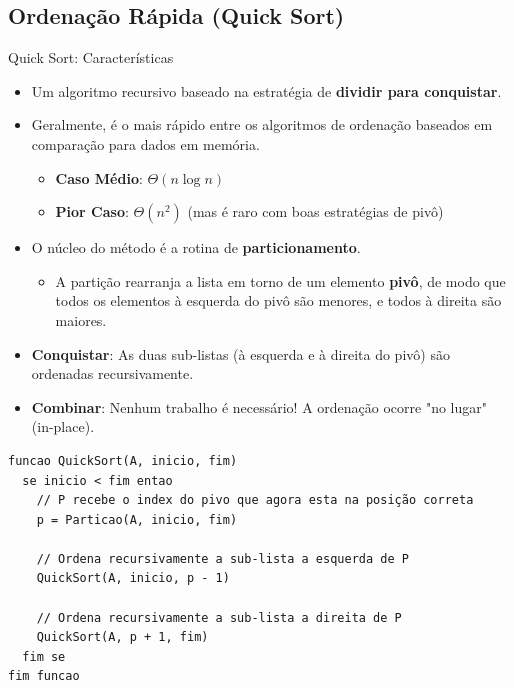 \documentclass{beamer}
\begin{document}
\subsection{Ordenação Rápida (Quick Sort)}
\begin{frame}{Quick Sort: Características}
\begin{itemize}
 \item Um algoritmo recursivo baseado na estratégia de \textbf{dividir para conquistar}.
 \item Geralmente, é o mais rápido entre os algoritmos de ordenação baseados em comparação para dados em memória.
 \begin{itemize}
  \item \textbf{Caso Médio}: $\Theta(n \log n)$
  \item \textbf{Pior Caso}: $\Theta(n^2)$ (mas é raro com boas estratégias de pivô)
 \end{itemize}
 \item O núcleo do método é a rotina de \textbf{particionamento}.
  \begin{itemize}
  \item A partição rearranja a lista em torno de um elemento \textbf{pivô}, de modo que todos os elementos à esquerda do pivô são menores, e todos à direita são maiores.
 \end{itemize}
 \item \textbf{Conquistar}: As duas sub-listas (à esquerda e à direita do pivô) são ordenadas recursivamente.
 \item \textbf{Combinar}: Nenhum trabalho é necessário! A ordenação ocorre "no lugar" (in-place).
\end{itemize}
\end{frame}

\begin{frame}[fragile]
\begin{lstlisting}[mathescape=true]
funcao QuickSort(A, inicio, fim)
  se inicio < fim entao
    // P recebe o index do pivo que agora esta na posição correta
    p = Particao(A, inicio, fim)

    // Ordena recursivamente a sub-lista a esquerda de P
    QuickSort(A, inicio, p - 1)

    // Ordena recursivamente a sub-lista a direita de P
    QuickSort(A, p + 1, fim)
  fim se
fim funcao
\end{lstlisting}

\end{frame}
\end{document}
